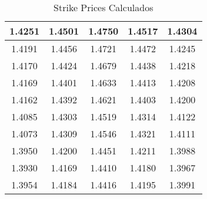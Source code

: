 \begin{table}                                
\centering                                   
\begin{tabular}{|c|c|c|c|c|}                 
\hline                                       
1.4251 & 1.4501 & 1.4750 & 1.4517 & 1.4304 \\
\hline                                       
1.4191 & 1.4456 & 1.4721 & 1.4472 & 1.4245 \\
\hline                                       
1.4170 & 1.4424 & 1.4679 & 1.4438 & 1.4218 \\
\hline                                       
1.4169 & 1.4401 & 1.4633 & 1.4413 & 1.4208 \\
\hline                                       
1.4162 & 1.4392 & 1.4621 & 1.4403 & 1.4200 \\
\hline                                       
1.4085 & 1.4303 & 1.4519 & 1.4314 & 1.4122 \\
\hline                                       
1.4073 & 1.4309 & 1.4546 & 1.4321 & 1.4111 \\
\hline                                       
1.3950 & 1.4200 & 1.4451 & 1.4211 & 1.3988 \\
\hline                                       
1.3930 & 1.4169 & 1.4410 & 1.4180 & 1.3967 \\
\hline                                       
1.3954 & 1.4184 & 1.4416 & 1.4195 & 1.3991 \\
\hline                                       
\end{tabular}                                
\caption{Strike Prices Calculados}                     
\label{table:MyTableLabel}                   
\end{table}   

